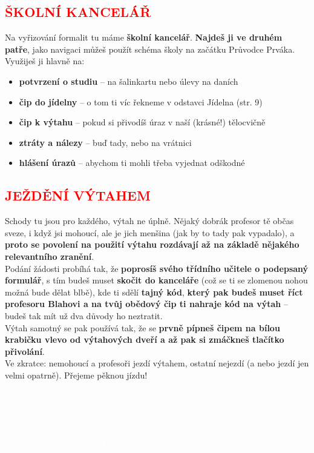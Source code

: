 \documentclass{article}
\newcommand{\podnadpis}[1]{
  \subsection*{\textcolor{red}{#1}}
}
\begin{document}
\podnadpis{ŠKOLNÍ KANCELÁŘ}

Na vyřizování formalit tu máme \textbf{školní kancelář}. \textbf{Najdeš ji ve druhém patře}, jako
navigaci můžeš použít schéma školy na začátku Průvodce Prváka.
Využiješ ji hlavně na:
\begin{itemize}[leftmargin=10pt]
  \item \textbf{potvrzení o studiu} -- na šalinkartu nebo úlevy na daních
  \item \textbf{čip do jídelny} -- o tom ti víc řekneme v odstavci Jídelna (str. 9)
  \item \textbf{čip k výtahu} -- pokud si přivodíš úraz v naší (krásné!) tělocvičně
  \item \textbf{ztráty a nálezy} -- buď tady, nebo na vrátnici
  \item \textbf{hlášení úrazů} -- abychom ti mohli třeba vyjednat odškodné
\end{itemize}

\podnadpis{JEŽDĚNÍ VÝTAHEM}
Schody tu jsou pro každého, výtah ne úplně. Nějaký dobrák profesor tě občas sveze, i když jsi mohoucí, ale je jich menšina (jak by to tady pak vypadalo), a \textbf{proto se povolení na použití výtahu rozdávají až na základě nějakého relevantního zranění}. \\
Podání žádosti probíhá tak, že \textbf{poprosíš svého třídního učitele o podepsaný formulář}, s tím budeš muset \textbf{skočit do kanceláře} (což se ti se zlomenou nohou možná bude dělat blbě), kde ti sdělí \textbf{tajný kód}, \textbf{který pak budeš muset říct profesoru Blahovi a na tvůj
obědový čip ti nahraje kód na výtah} -- budeš tak mít už dva důvody ho neztratit. \\
Výtah samotný se pak používá tak, že se \textbf{prvně pípneš čipem na bílou krabičku
vlevo od výtahových dveří a až pak si zmáčkneš tlačítko přivolání}. \\
Ve zkratce: nemohoucí a profesoři jezdí výtahem, ostatní nejezdí (a nebo jezdí jen
velmi opatrně). Přejeme pěknou jízdu!

\begin{redbox}
  \textcolor{white}{\footnotesize Poznámka: Ne že bys nejen nesměl jezdit zdravý výtahem, ono to taky dost dobře nejde. Bez oprávnění na čipu tě výtah prostě nebude poslouchat a nepřijede ti. Když už je mysteriózně otevřen na patře prázdný, nikdo ti asi nebude fyzicky bránit do něj naskočit a odjet – ale pokud tě při tom načapá profesor, který to nemá rád, dostaneš bídu. Takže bacha.}
\end{redbox}
\end{document}
